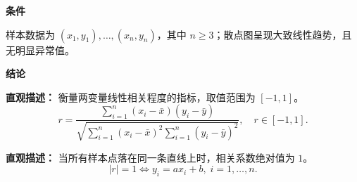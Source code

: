 \begin{statementbox}
	\textbf{\textcolor{CStatement}{条件}}
	\begin{description}[style=nextline, leftmargin=2.8em, labelsep=0.5em, itemsep=0.35em]
		\item[\textbf{\textcolor{CStatement}{条件1（样本要求）：}}] 样本数据为 $(x_1,y_1),\dots,(x_n,y_n)$，其中 $n\ge 3$；散点图呈现大致线性趋势，且无明显异常值。
	\end{description}

	\textbf{\textcolor{CStatement}{结论}}
	\begin{description}[style=nextline, leftmargin=2.8em, labelsep=0.5em, itemsep=0.45em]
		\item[\textbf{\textcolor{CStatement}{结论一（相关系数定义）：}}]
			\textbf{\textcolor{CStatement}{直观描述：}}
			衡量两变量线性相关程度的指标，取值范围为 $[-1,1]$。
			\[
				r=\frac{\sum_{i=1}^{n}(x_i-\bar{x})(y_i-\bar{y})}
				{\sqrt{\sum_{i=1}^{n}(x_i-\bar{x})^2\sum_{i=1}^{n}(y_i-\bar{y})^2}},\quad r\in[-1,1].
			\]

		\item[\textbf{\textcolor{CStatement}{常见推论（完全线性相关）：}}]
			\textbf{\textcolor{CStatement}{直观描述：}}
			当所有样本点落在同一条直线上时，相关系数绝对值为 $1$。
			\[
				|r|=1 \iff y_i = a x_i + b,\; i=1,\dots,n.
			\]
	\end{description}
\end{statementbox}
